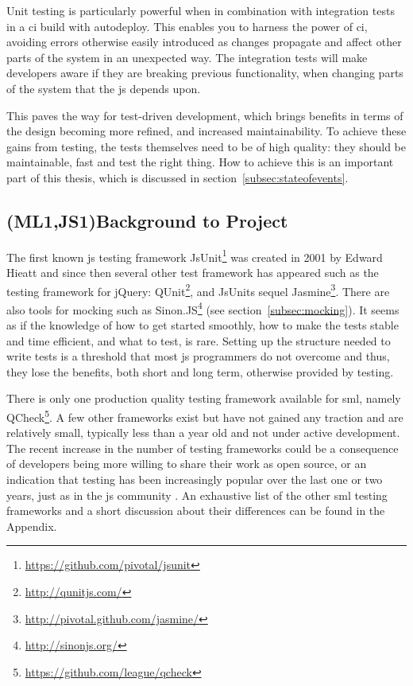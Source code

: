 \documentclass[11pt]{article}
\begin{document}
Unit testing is particularly powerful when in combination with integration tests in a \gls{ci} build with \gls{autodeploy}.
This enables you to harness the power of \gls{ci}, avoiding errors otherwise easily introduced as changes propagate and affect other parts of the system in an unexpected way. The integration tests will make developers aware if they are breaking previous functionality, when changing parts of the system that the \gls{js} depends upon.

This paves the way for test-driven development, which brings benefits in terms of the design becoming more refined, and increased maintainability. To achieve these gains from testing, the tests themselves need to be of high quality: they should be maintainable, fast and test the right thing. How to achieve this is an important part of this thesis, which is discussed in section~\ref{subsec:stateofevents}.

\subsection{(ML1,JS1)Background to Project}
\label{mltestingframeworks}

The first known \gls{js} testing framework JsUnit\footnote{\url{https://github.com/pivotal/jsunit}} was created in 2001 by Edward Hieatt \cite{GoingFaster} and since then several other test framework has appeared such as the testing framework for jQuery: QUnit\footnote{\url{http://qunitjs.com/}}, and JsUnits sequel Jasmine\footnote{\url{http://pivotal.github.com/jasmine/}}. There are also tools for mocking such as Sinon.JS\footnote{\url{http://sinonjs.org/}} (see section~\ref{subsec:mocking}). It seems as if the knowledge of how to get started smoothly, how to make the tests stable and time efficient, and what to test, is rare. Setting up the structure needed to write tests is a threshold that most \gls{js} programmers do not overcome \cite{TestingStatistics} and thus, they lose the benefits, both short and long term, otherwise provided by testing.

There is only one production quality testing framework available for \gls{sml}, namely QCheck\footnote{\url{https://github.com/league/qcheck}}. A few other frameworks exist but have not gained any traction and are relatively small, typically less than a year old and not under active development. The recent increase in the number of testing frameworks could be a consequence of developers being more willing to share their work as open source, or an indication that testing has been increasingly popular over the last one or two years, just as in the \gls{js} community \cite[question~1]{Edelstam}. An exhaustive list of the other \gls{sml} testing frameworks and a short discussion about their differences can be found in the Appendix.
\end{document}
